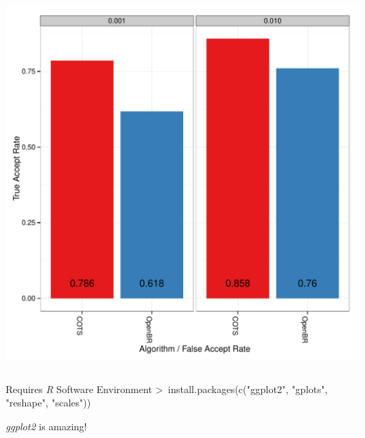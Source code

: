 \documentclass[12pt]{beamer}
\begin{document}
\begin{frame}
\begin{columns}
    \includegraphics[width=\textwidth]{img/MEDS/MEDS_BC}
\end{columns}
\pause
\begin{block}{Requires \emph{R} Software Environment}
\textgreater \ install.packages(c("ggplot2", "gplots", "reshape", "scales"))
\end{block}
\pause
\begin{block}{}
\emph{ggplot2} is amazing!
\end{block}
\end{frame}
\end{document}
